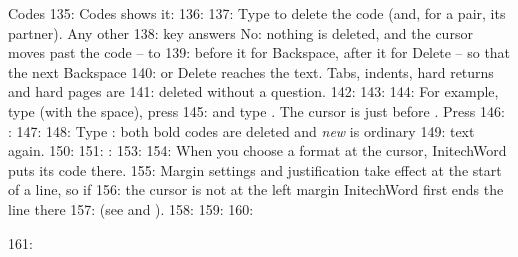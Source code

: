 \begin{Feature}{Codes}
135: Codes shows it:
136: 
137: Type  to delete the code (and, for a pair, its partner).  Any other
138: key answers No: nothing is deleted, and the cursor moves past the code -- to
139: before it for Backspace, after it for Delete -- so that the next Backspace
140: or Delete reaches the text.  Tabs, indents, hard returns and hard pages are
141: deleted without a question.
142: 
143: 
144: For example, type (with the space), press 
145: and type .  The cursor is just before \Code{[bold]}.  Press
146: :
147: 
148: Type : both bold codes are deleted and \textit{new} is ordinary
149: text again.
150: 
151: : 
153: 
154: When you choose a format at the cursor, InitechWord puts its code there.
155: Margin settings and justification take effect at the start of a line, so if
156: the cursor is not at the left margin InitechWord first ends the line there
157: (see  and ).
158: 
159: 
160: \end{Feature}
161: 

